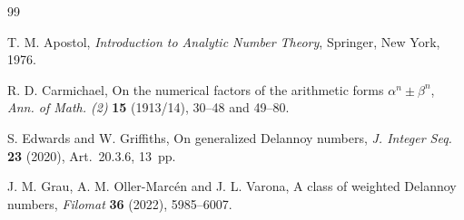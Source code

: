 \documentclass[11pt, a4paper]{article}
\theoremstyle{plain}
\theoremstyle{definition}
\begin{document}
\begin{thebibliography}{99}

T. M. Apostol,  
\textit{Introduction to Analytic Number Theory}, 
Springer, New York, 1976.





R. D. Carmichael, 
On the numerical factors of the arithmetic forms $\alpha^n\pm \beta^n$,
\textit{Ann. of Math. (2)} \textbf{15} (1913/14), 30--48 and 49--80.

S. Edwards and W. Griffiths, %
On generalized Delannoy numbers,
\textit{J. Integer Seq.} \textbf{23} (2020), Art.~20.3.6, 13~pp. %



J. M. Grau, A. M. Oller-Marc\'en and J. L. Varona, 
A class of weighted Delannoy numbers, 
\textit{Filomat} \textbf{36} (2022), 5985--6007. %


\end{thebibliography}
\end{document}
